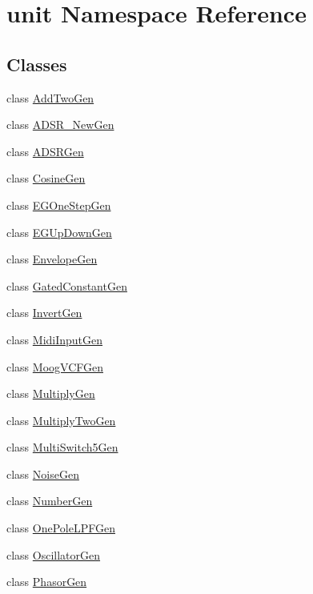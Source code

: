 \hypertarget{namespaceunit}{\section{unit Namespace Reference}
\label{namespaceunit}
}
\subsection*{Classes}
\begin{DoxyCompactItemize}
\item 
class \hyperlink{classunit_1_1AddTwoGen}{Add\-Two\-Gen}
\item 
class \hyperlink{classunit_1_1ADSR__NewGen}{A\-D\-S\-R\-\_\-\-New\-Gen}
\item 
class \hyperlink{classunit_1_1ADSRGen}{A\-D\-S\-R\-Gen}
\item 
class \hyperlink{classunit_1_1CosineGen}{Cosine\-Gen}
\item 
class \hyperlink{classunit_1_1EGOneStepGen}{E\-G\-One\-Step\-Gen}
\item 
class \hyperlink{classunit_1_1EGUpDownGen}{E\-G\-Up\-Down\-Gen}
\item 
class \hyperlink{classunit_1_1EnvelopeGen}{Envelope\-Gen}
\item 
class \hyperlink{classunit_1_1GatedConstantGen}{Gated\-Constant\-Gen}
\item 
class \hyperlink{classunit_1_1InvertGen}{Invert\-Gen}
\item 
class \hyperlink{classunit_1_1MidiInputGen}{Midi\-Input\-Gen}
\item 
class \hyperlink{classunit_1_1MoogVCFGen}{Moog\-V\-C\-F\-Gen}
\item 
class \hyperlink{classunit_1_1MultiplyGen}{Multiply\-Gen}
\item 
class \hyperlink{classunit_1_1MultiplyTwoGen}{Multiply\-Two\-Gen}
\item 
class \hyperlink{classunit_1_1MultiSwitch5Gen}{Multi\-Switch5\-Gen}
\item 
class \hyperlink{classunit_1_1NoiseGen}{Noise\-Gen}
\item 
class \hyperlink{classunit_1_1NumberGen}{Number\-Gen}
\item 
class \hyperlink{classunit_1_1OnePoleLPFGen}{One\-Pole\-L\-P\-F\-Gen}
\item 
class \hyperlink{classunit_1_1OscillatorGen}{Oscillator\-Gen}
\item 
class \hyperlink{classunit_1_1PhasorGen}{Phasor\-Gen}
\item 

\end{DoxyCompactItemize}
